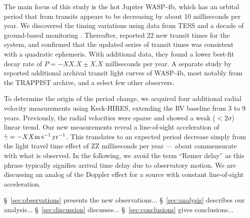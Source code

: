 \documentclass[12pt,twocolumn,tighten]{aastex62}
\begin{document}
The main focus of this study is the hot Jupiter WASP-4b, which has an
orbital period that from transits appears to be decreasing by about 10
milliseconds per year.  We discovered the timing variations using
data from TESS and a decade of ground-based monitoring
\citep[][hereafter ]{bouma_wasp4b_2019}.
Thereafter, \citet{southworth_transit_2019} reported 22 new transit
times for the system, and confirmed that the updated series of transit
times was consistent with a quadratic ephemeris.  With additional
data, they found a lower best-fit decay rate of $\dot{P} = -XX.X \pm
X.X$ milliseconds per year.
A separate study by \citet{baluev_2019} reported
additional archival transit light curves of WASP-4b, most notably from
the TRAPPIST archive, and a select few other observers.

To determine the origin of the period change, we acquired four
additional radial velocity measurements using Keck-HIRES, extending
the RV baseline from 3 to 9 years.  Previously, the radial velocities
were sparse and showed a weak ($<2\sigma$) linear trend.  Our new
measurements reveal a line-of-sight acceleration of $\dot{\gamma} =
-XX {\rm m\,s^{-1}\,yr^{-1}}$.  This translates to an expected period
decrease simply from the light travel time effect of ZZ milliseconds
per year --- about commensurate with what is observed.
In the following, we avoid the term ``R{\o}mer delay'' as this phrase
typically signifies arrival time delay due to observatory motion. We
are discussing an analog of the Doppler effect for a source with
constant line-of-sight acceleration.


\S~\ref{sec:observations} presents the new observations...
\S~\ref{sec:analysis} describes our analysis...
\S~\ref{sec:discussion} discusses...
\S~\ref{sec:conclusions} gives conclusions...
\end{document}
